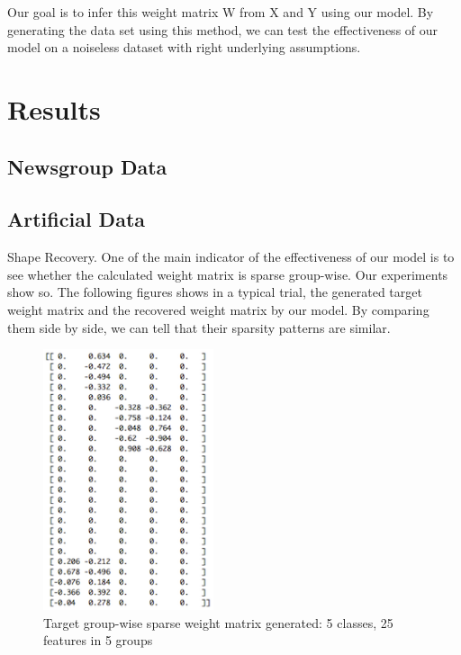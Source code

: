 \documentclass[11pt]{article}
\begin{document}
Our goal is to infer this weight matrix W from X and Y using our model. By generating the data set using this method, we can test the effectiveness of our model on a noiseless dataset with right underlying assumptions.\\ 


\section{Results}

\subsection{Newsgroup Data}

\subsection{Artificial Data}

Shape Recovery. One of the main indicator of the effectiveness of our model is to see whether the calculated weight matrix is sparse group-wise. Our experiments show so. The following figures shows in a typical trial, the generated target weight matrix and the recovered weight matrix by our model. By comparing them side by side, we can tell that their sparsity patterns are similar. 

\begin{figure}[ht]
\begin{center}
	\includegraphics[width=5cm, natwidth=200, natheight=307]{m1_img}
	\caption{Target group-wise sparse weight matrix generated: 5 classes, 25 features in 5 groups}
\end{center}
\end{figure}
\end{document}

